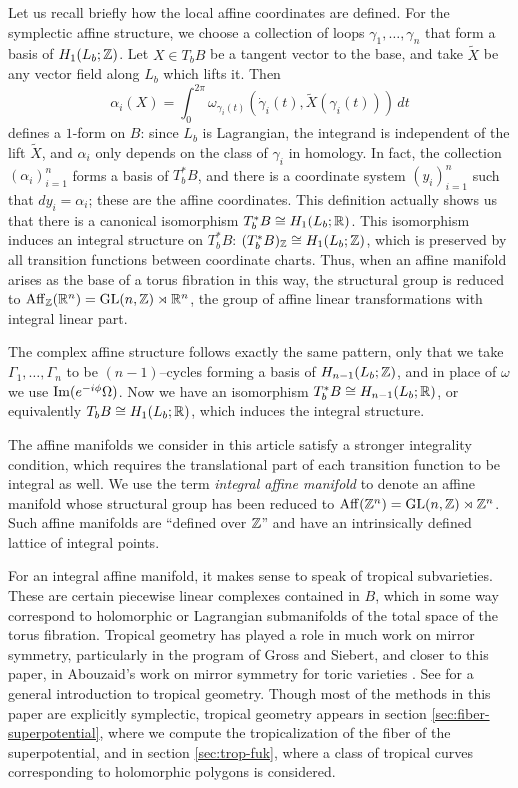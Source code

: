 \documentclass[12pt]{amsart}
\begin{document}
Let us recall briefly how the local affine coordinates are
defined. For the symplectic affine structure, we choose a collection
of loops $\gamma_1,\dots,\gamma_n$ that form a basis of
$H_1(L_b;\mathbb{Z})$. Let $X \in T_bB$ be a tangent vector to the base, and
take $\tilde{X}$ be any vector field along $L_b$ which lifts it. Then
\begin{equation}
  \alpha_i(X) = \int_0^{2\pi} \omega_{\gamma_i(t)}(\dot{\gamma}_i(t),\tilde{X}(\gamma_i(t)))\,dt
\end{equation}
defines a $1$-form on $B$: since $L_b$ is Lagrangian, the integrand is
independent of the lift $\tilde{X}$, and $\alpha_i$ only depends on
the class of $\gamma_i$ in homology. In fact, the collection
$(\alpha_i)_{i=1}^n$ forms a basis of $T^*_bB$, and there is a
coordinate system $(y_i)_{i=1}^n$ such that $dy_i = \alpha_i$; these
are the affine coordinates. This definition actually shows us that
there is a canonical isomorphism $T^*_bB \cong H_1(L_b;\mathbb{R})$. This isomorphism induces an
integral structure on $T^*_bB$: $(T^*_bB)_\mathbb{Z} \cong H_1(L_b;\mathbb{Z})$, which is
preserved by all transition functions between coordinate charts. Thus,
when an affine manifold arises as the base of a torus fibration in
this way, the structural group is reduced to $\mathrm{Aff}_\mathbb{Z}(\mathbb{R}^n) =
\mathrm{GL}(n,\mathbb{Z}) \rtimes \mathbb{R}^n$, the group of affine linear transformations
with integral linear part.

The complex affine structure follows exactly the same pattern, only
that we take $\Gamma_1,\dots,\Gamma_n$ to be $(n-1)$--cycles forming a
basis of $H_{n-1}(L_b;\mathbb{Z})$, and in place of $\omega$ we use
$\operatorname{Im}(e^{-i\phi}\Omega)$. Now we have an isomorphism $T^*_bB \cong
H_{n-1}(L_b;\mathbb{R})$, or equivalently $T_bB \cong H_1(L_b;\mathbb{R})$, which
induces the integral structure.

The affine manifolds we consider in this article satisfy a stronger
integrality condition, which requires the translational part of each
transition function to be integral as well. We use the term
\emph{integral affine manifold} to denote an affine manifold whose
structural group has been reduced to $\mathrm{Aff}(\mathbb{Z}^n) = \mathrm{GL}(n,\mathbb{Z})\rtimes
\mathbb{Z}^n$. Such affine manifolds are ``defined over $\mathbb{Z}$'' and have an
intrinsically defined lattice of integral points.

For an integral affine manifold, it makes sense to speak of tropical
subvarieties. These are certain piecewise linear complexes contained
in $B$, which in some way correspond to holomorphic or Lagrangian
submanifolds of the total space of the torus fibration. Tropical
geometry has played a role in much work on mirror symmetry,
particularly in the program of Gross and Siebert, and closer to this
paper, in Abouzaid's work on mirror symmetry for toric varieties
\cite{abouzaid06,abouzaid09}. See \cite{tropical-AG} for a general
introduction to tropical geometry. Though most of the methods in this
paper are explicitly symplectic, tropical geometry appears in section
\ref{sec:fiber-superpotential}, where we compute the tropicalization
of the fiber of the superpotential, and in section \ref{sec:trop-fuk},
where a class of tropical curves corresponding to holomorphic polygons
is considered.
\end{document}
